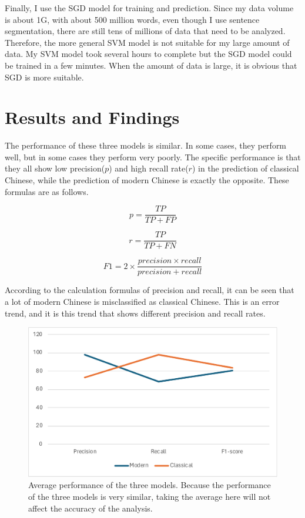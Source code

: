 \documentclass[11pt]{article}
\begin{document}
Finally, I use the SGD model for training and prediction. Since my data volume is about 1G, with about 500 million words, even though I use sentence segmentation, there are still tens of millions of data that need to be analyzed. Therefore, the more general SVM model is not suitable for my large amount of data. My SVM model took several hours to complete but the SGD model could be trained in a few minutes. When the amount of data is large, it is obvious that SGD is more suitable.


\section{Results and Findings}

The performance of these three models is similar. In some cases, they perform well, but in some cases they perform very poorly. The specific performance is that they all show low precision($p$) and high recall rate($r$) in the prediction of classical Chinese, while the prediction of modern Chinese is exactly the opposite. These formulas are as follows.

\begin{equation}
  \label{eq:example}
  p = \frac{TP}{TP+FP}
\end{equation}

\begin{equation}
  \label{eq:example}
  r = \frac{TP}{TP+FN}
\end{equation}

\begin{equation}
  \label{eq:example}
  F1 = 2 \times \frac{precision\times recall}{precision+recall}
\end{equation}

According to the calculation formulas of precision and recall, it can be seen that a lot of modern Chinese is misclassified as classical Chinese. This is an error trend, and it is this trend that shows different precision and recall rates.

\begin{figure}[t]
  \includegraphics[width=\columnwidth]{figures/2.pdf}
  \caption{Average performance of the three models. Because the performance of the three models is very similar, taking the average here will not affect the accuracy of the analysis.}
  \label{fig:average}
\end{figure}
\end{document}
